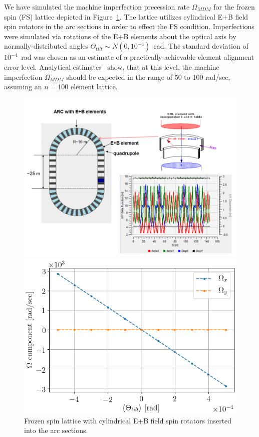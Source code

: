 \documentclass[a4paper]{jpconf}
\newcommand{\W}{\Omega}
\begin{document}
We have simulated the machine imperfection precession rate $\W_{MDM}$ for the frozen spin (FS) lattice depicted in Figure~\ref{fig:Lattice}. The lattice utilizes cylindrical E+B field spin rotators in the arc sections in order to effect the FS condition. Imperfections were simulated via rotations of the E+B elements about the optical axis by normally-distributed angles $\Theta_{tilt}\sim N(0,10^{-4})$~rad. The standard deviation of $10^{-4}$~rad was chosen as an estimate of a practically-achievable element alignment error level. Analytical estimates~\cite{Senichev:FDM} show, that at this level, the machine imperfection $\W_{MDM}$ should be expected in the range of 50 to 100 rad/sec, assuming an $n=100$ element lattice.


\begin{figure}[h]\centering
	\begin{minipage}{.5\linewidth}
		\includegraphics[width=\linewidth]{Figures/BNL}
		\caption{Frozen spin lattice with cylindrical E+B field spin rotators inserted into the arc sections.\label{fig:Lattice}}
	\end{minipage}\hspace*{2mm}
	\begin{minipage}{.5\linewidth}
		\includegraphics[width=\linewidth]{Figures/linearity_test_shifting_gauss_freq}

\end{minipage}
\end{figure}
\end{document}
